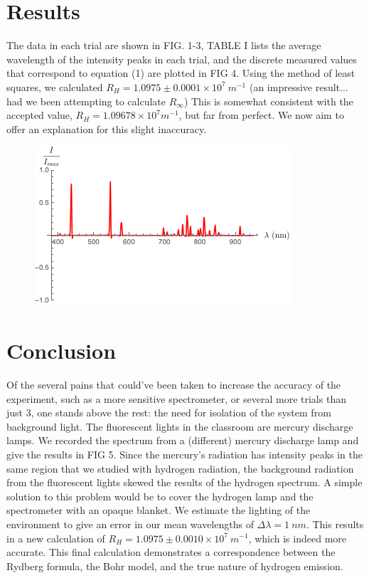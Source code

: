 \documentclass[aps,prl,preprint,groupedaddress]{revtex4-2}
\begin{document}
\section{Results}
The data in each trial are shown in FIG. 1-3, TABLE I lists the average wavelength of the intensity peaks in each trial, and the discrete measured values that correspond to equation (1) are plotted in FIG 4. Using the method of least squares, we calculated $R_H=1.0975 \pm 0.0001 \times 10^7 ~\si{m^{-1}}$ (an impressive result... had we been attempting to calculate $R_\infty$) This is somewhat consistent with the accepted value, $R_H = 1.09678 \times 10^7 \si{m^{-1}}$, but far from perfect. We now aim to offer an explanation for this slight inaccuracy.
    \begin{figure}
        \centering
        \includegraphics{hg.png}
        \caption{}
    \end{figure}
\section{Conclusion}
Of the several pains that could've been taken to increase the accuracy of the experiment, such as a more sensitive spectrometer, or several more trials than just 3, one stands above the rest: the need for isolation of the system from background light. The fluorescent lights in the classroom are mercury discharge lamps. We recorded the spectrum from a (different) mercury discharge lamp and give the results in FIG 5. Since the mercury's radiation has intensity peaks in the same region that we studied with hydrogen radiation, the background radiation from the fluorescent lights skewed the results of the hydrogen spectrum. A simple solution to this problem would be to cover the hydrogen lamp and the spectrometer with an opaque blanket. We estimate the lighting of the environment to give an error in our mean wavelengths of $\Delta \lambda = 1~\si{nm}$. This results in a new calculation of $R_H = 1.0975 \pm 0.0010 \times 10^7~\si{m^{-1}}$, which is indeed more accurate. This final calculation demonstrates a correspondence between the Rydberg formula, the Bohr model, and the true nature of hydrogen emission.

\printbibliography
\end{document}

